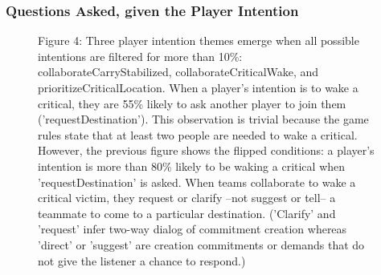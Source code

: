 \subsubsection{Questions Asked, given the Player Intention}

\begin{figure}[h!]
    \centering
    \caption{Figure 4: Three player intention themes emerge when all possible intentions are filtered for more than 10\%: collaborateCarryStabilized, collaborateCriticalWake, and prioritizeCriticalLocation. When a player's intention is to wake a critical, they are 55\% likely to ask another player to join
 them ('requestDestination'). This observation is trivial because the game rules state that at least two people are needed to wake a critical. However, the previous figure shows the flipped conditions: a player's intention is more than 80\% likely to be waking a critical when 'requestDestination' is asked. When teams collaborate to wake a critical victim, they request or clarify --not suggest or tell-- a teammate to come to a particular destination. ('Clarify' and 'request' infer two-way dialog of commitment creation whereas 'direct' or 'suggest' are creation commitments or demands that do not give the listener a chance to respond.) }
\end{figure}








